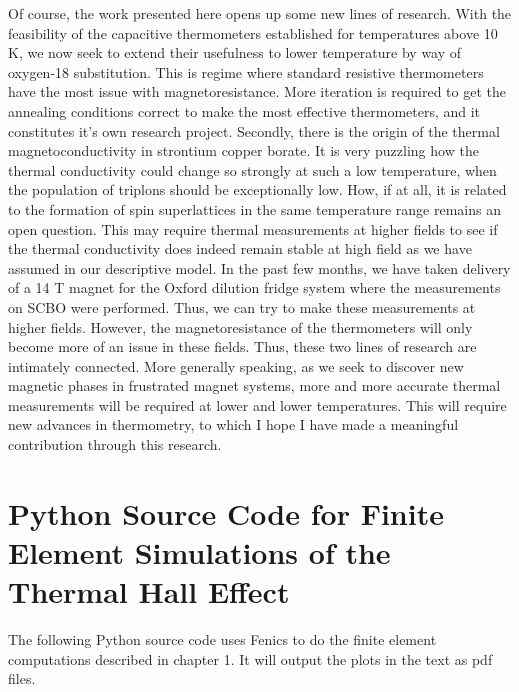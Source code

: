 \documentclass{thesis-umich}
\begin{document}
Of course, the work presented here opens up some new lines of research. With the feasibility of the capacitive thermometers established for temperatures above 10 K, we now seek to extend their usefulness to lower temperature by way of oxygen-18 substitution. This is regime where standard resistive thermometers have the most issue with magnetoresistance. More iteration is required to get the annealing conditions correct to make the most effective thermometers, and it constitutes it's own research project. Secondly, there is the origin of the thermal magnetoconductivity in strontium copper borate. It is very puzzling how the thermal conductivity could change so strongly at such a low temperature, when the population of triplons should be exceptionally low. How, if at all, it is related to the formation of spin superlattices in the same temperature range remains an open question. This may require thermal measurements at higher fields to see if the thermal conductivity does indeed remain stable at high field as we have assumed in our descriptive model. In the past few months, we have taken delivery of a 14 T magnet for the Oxford dilution fridge system where the measurements on SCBO were performed. Thus, we can try to make these measurements at higher fields. However, the magnetoresistance of the thermometers will only become more of an issue in these fields. Thus, these two lines of research are intimately connected. More generally speaking, as we seek to discover new magnetic phases in frustrated magnet systems, more and more accurate thermal measurements will be required at lower and lower temperatures. This will require new advances in thermometry, to which I hope I have made a meaningful contribution through this research. 

\appendix
\chapter{Python Source Code for Finite Element Simulations of the Thermal Hall Effect} \label{app:fem_src}

The following Python source code uses Fenics to do the finite element computations described in chapter 1. It will output the plots in the text as pdf files.
\end{document}
